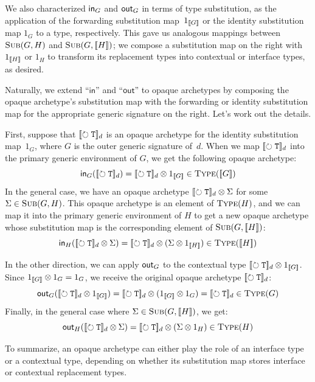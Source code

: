 \documentclass[../generics]{subfiles}
\begin{document}
We also characterized $\mathsf{in}_G$ and $\mathsf{out}_G$ in terms of type substitution, as the application of the forwarding substitution map~$1_{[\![G]\!]}$ or the identity substitution map $1_G$ to a type, respectively. This gave us analogous mappings between $\textsc{Sub}({G, H})$ and $\textsc{Sub}({G, [\![H]\!]})$; we compose a substitution map on the right with $1_{[\![H]\!]}$ or $1_H$ to transform its replacement types into contextual or interface types, as desired.

Naturally, we extend ``$\mathsf{in}$'' and ``$\mathsf{out}$'' to opaque archetypes by composing the opaque archetype's substitution map with the forwarding or identity substitution map for the appropriate generic signature on the right. Let's work out the details.

First, suppose that $[\![\circlearrowright \texttt{\texttt{T}}]\!]_d$ is an opaque archetype for the identity substitution map~$1_G$, where $G$ is the outer generic signature of~$d$. When we map $[\![\circlearrowright \texttt{\texttt{T}}]\!]_d$ into the primary generic environment of $G$, we get the following opaque archetype:
\[
\MapIn(\Ot_d) = \Ot_d \otimes \FwdMap{G} \in \TypeObjCtx{G}
\]
In the general case, we have an opaque archetype $[\![\circlearrowright \texttt{\texttt{T}}]\!]_d \otimes \Sigma$ for some $\Sigma \in \textsc{Sub}({G, H})$. This opaque archetype is an element of $\textsc{Type}({H})$, and we can map it into the primary generic environment of $H$ to get a new opaque archetype whose substitution map is the corresponding element of $\textsc{Sub}({G, [\![H]\!]})$:
\[
\mathsf{in}_H(\Ot_d \otimes \Sigma) = \Ot_d \otimes (\Sigma \otimes \FwdMap{H}) \in \TypeObjCtx{H}
\]

In the other direction, we can apply $\mathsf{out}_G$ to the contextual type $[\![\circlearrowright \texttt{\texttt{T}}]\!]_d \otimes 1_{[\![G]\!]}$. Since $1_{[\![G]\!]} \otimes 1_G = 1_G$, we receive the original opaque archetype $[\![\circlearrowright \texttt{\texttt{T}}]\!]_d$:
\[
\MapOut(\Ot_d \otimes \FwdMap{G}) = \Ot_d \otimes (\FwdMap{G} \otimes 1_G) = \Ot_d \in \TypeObj{G}
\]
Finally, in the general case where $\Sigma \in \textsc{Sub}({G, [\![H]\!]})$, we get:
\[
\mathsf{out}_H([\![\circlearrowright \texttt{\texttt{T}}]\!]_d \otimes \Sigma) = [\![\circlearrowright \texttt{\texttt{T}}]\!]_d \otimes (\Sigma \otimes 1_H) \in \textsc{Type}({H})
\]

To summarize, an opaque archetype can either play the role of an interface type or a contextual type, depending on whether its substitution map stores interface or contextual replacement types.
\end{document}
